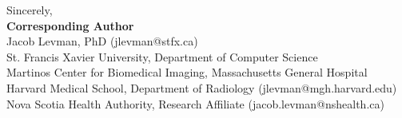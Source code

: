 \documentclass[10pt,letter]{article}
\begin{document}





\bigskip

\noindent
Sincerely, \\

\small
\noindent
\textbf{Corresponding Author}\\
Jacob Levman, PhD (jlevman@stfx.ca) \\
\footnotesize
\hspace*{0.25cm}St. Francis Xavier University, Department of Computer Science  \\
\hspace*{0.25cm}Martinos Center for Biomedical Imaging, Massachusetts General Hospital \\
\hspace*{0.25cm}Harvard Medical School, Department of Radiology (jlevman@mgh.harvard.edu) \\
\hspace*{0.25cm}Nova Scotia Health Authority, Research Affiliate (jacob.levman@nshealth.ca) \\
\normalsize
\end{document}
